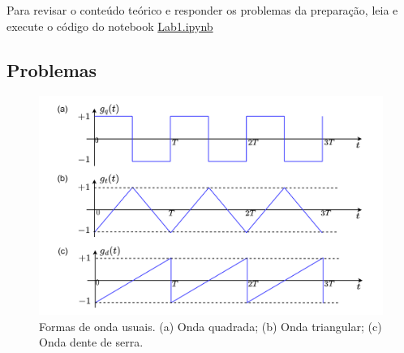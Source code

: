 \documentclass[12pt,addpoints]{exam}
\begin{document}
Para revisar o conteúdo teórico e responder os problemas da preparação, leia e execute o código do notebook \href{https://github.com/edsonportosilva/LPC/blob/master/Jupyter/Lab1/Lab1.ipynb}{Lab1.ipynb}

\subsection{Problemas}

\begin{figure}[t]
        \centering
        \includegraphics[width=0.75\linewidth]{./Figuras/Labo1Fig1.png}
        \caption{Formas de onda usuais. (a) Onda quadrada; (b) Onda triangular; (c) Onda dente de serra. }
        \label{fig:sinaisusuais}
\end{figure}
\end{document}
